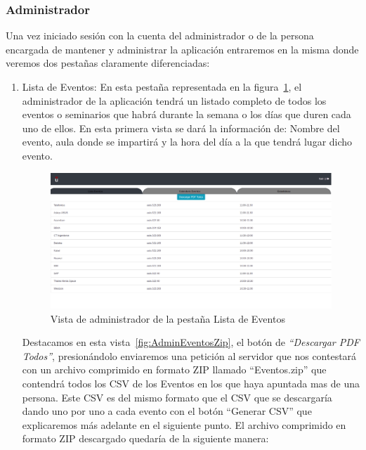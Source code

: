 \documentclass[a4paper, 12pt]{book}
\begin{document}
\subsubsection{Administrador}
	Una vez iniciado sesión con la cuenta del administrador o de la persona encargada de mantener y administrar la aplicación entraremos en la misma donde veremos dos pestañas claramente diferenciadas:
\begin{enumerate}	
	\item Lista de Eventos: En esta pestaña representada en la figura~\ref{fig:adminListaEventos}, el administrador de la aplicación tendrá un listado completo de todos los eventos o seminarios que habrá durante la semana o los días que duren cada uno de ellos. En esta primera vista se dará la información de: Nombre del evento, aula donde se impartirá y la hora del día a la que tendrá lugar dicho evento.
	\begin{figure}[h!]
  	\centering
  	\includegraphics[width=16cm, keepaspectratio]{img/adminListaEventos.png}
  	\caption{Vista de administrador de la pestaña Lista de Eventos}\label{fig:adminListaEventos}
	\end{figure}
	
\vspace{6cm}


Destacamos en esta vista~\ref{fig:AdminEventosZip}, el botón de \textit{``Descargar PDF Todos''}, presionándolo enviaremos una petición al servidor que nos contestará con un archivo comprimido en formato ZIP llamado ``Eventos.zip'' que contendrá todos los CSV de los Eventos en los que haya apuntada mas de una persona. Este CSV es del mismo formato que el CSV que se descargaría dando uno por uno a cada evento con el botón ``Generar CSV'' que explicaremos más adelante en el siguiente punto. El archivo comprimido en formato ZIP descargado quedaría de la siguiente manera:
	

\end{enumerate}
\end{document}
